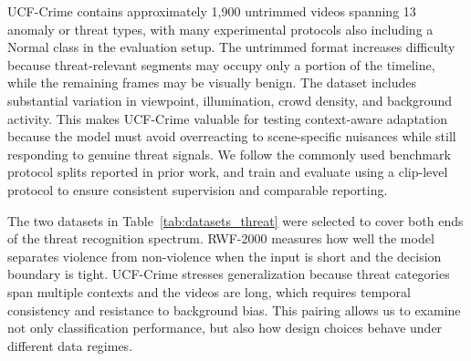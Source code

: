 \documentclass[AMA,Times1COL]{WileyNJDv5} %
\begin{document}
UCF-Crime contains approximately 1{,}900 untrimmed videos spanning 13 anomaly or threat types, with many experimental protocols also including a Normal class in the evaluation setup. The untrimmed format increases difficulty because threat-relevant segments may occupy only a portion of the timeline, while the remaining frames may be visually benign. The dataset includes substantial variation in viewpoint, illumination, crowd density, and background activity. This makes UCF-Crime valuable for testing context-aware adaptation because the model must avoid overreacting to scene-specific nuisances while still responding to genuine threat signals. We follow the commonly used benchmark protocol splits reported in prior work, and train and evaluate using a clip-level protocol to ensure consistent supervision and comparable reporting.

The two datasets in Table~\ref{tab:datasets_threat} were selected to cover both ends of the threat recognition spectrum. RWF-2000 measures how well the model separates violence from non-violence when the input is short and the decision boundary is tight. UCF-Crime stresses generalization because threat categories span multiple contexts and the videos are long, which requires temporal consistency and resistance to background bias. This pairing allows us to examine not only classification performance, but also how design choices behave under different data regimes.

\begin{table}[t]
\centering
\caption{Datasets used for threat classification in visual security systems.}
\label{tab:datasets_threat}
\renewcommand{\arraystretch}{1.1}
\setlength{\tabcolsep}{3.5pt}
\end{table}
\end{document}

